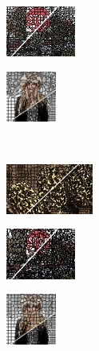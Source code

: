 \begin{figure}
\begin{subfigure}[b]{0.16\textwidth}
	\end{subfigure}
	\begin{subfigure}[b]{0.129\textwidth}
		\includegraphics[height=1.65cm]{pictures/sbd/mss/cropped/mss_6000067_contours}
	\end{subfigure}
	\begin{subfigure}[b]{0.10\textwidth}
		\includegraphics[height=1.65cm]{pictures/fash/mss/cropped/mss_132_contours}
	\end{subfigure}\\
	\begin{subfigure}[b]{0.02\textwidth}
	\end{subfigure}
	\begin{subfigure}[b]{0.16\textwidth}
		\includegraphics[height=1.65cm]{pictures/bsds500/preslic/cropped/preslic_208078_contours}
	\end{subfigure}
	\begin{subfigure}[b]{0.129\textwidth}
		\includegraphics[height=1.65cm]{pictures/sbd/preslic/cropped/preslic_6000067_contours}
	\end{subfigure}
	\begin{subfigure}[b]{0.10\textwidth}
		\includegraphics[height=1.65cm]{pictures/fash/preslic/cropped/preslic_132_contours}
	\end{subfigure}

\end{figure}
